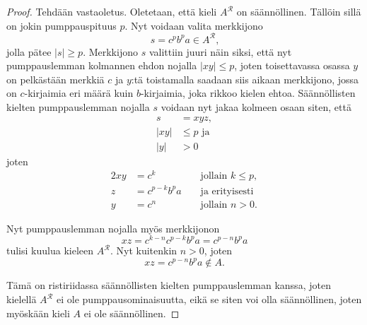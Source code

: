 \documentclass[a4paper,11pt]{article}
\begin{document}
\begin{enumerate}
\begin{enumerate}
\begin{proof}
            Tehdään vastaoletus. Oletetaan, että kieli $A^\mathcal{R}$ on säännöllinen.
            Tällöin sillä on jokin pumppauspituus $p$. Nyt voidaan valita merkkijono
            \begin{equation*}
              s = c^pb^pa \in A^\mathcal{R} \textrm{,}
            \end{equation*}
            jolla pätee $|s| \geq p$. Merkkijono $s$ valittiin juuri näin siksi, että
            nyt pumppauslemman kolmannen ehdon nojalla $|xy| \leq p$, joten
            toisettavassa osassa $y$ on pelkästään merkkiä $c$ ja $y$:tä toistamalla
            saadaan siis aikaan merkkijono, jossa on $c$-kirjaimia eri määrä kuin
            $b$-kirjaimia, joka rikkoo kielen ehtoa. Säännöllisten kielten
            pumppauslemman nojalla $s$ voidaan nyt jakaa kolmeen osaan siten, että
            \begin{align*}
              s    & = xyz, \\
              |xy| & \leq p \textrm{ ja}\\
              |y|  & > 0
            \end{align*}
            joten
            \begin{alignat*}{2}
              xy & = c^k         && \textrm{ jollain } k \leq p, \\
              z  & = c^{p-k}b^pa && \textrm{ ja erityisesti} \\
              y  & = c^n         && \textrm{ jollain } n > 0.
            \end{alignat*}
        
            Nyt pumppauslemman nojalla myös merkkijonon
            \begin{equation*}
              xz = c^{k-n}c^{p-k}b^pa = c^{p-n}b^pa
            \end{equation*}
            tulisi kuulua kieleen $A^\mathcal{R}$. Nyt kuitenkin $n > 0$, joten
            \begin{equation*}
              xz = c^{p-n}b^pa \notin A.
            \end{equation*}
        
            Tämä on ristiriidassa säännöllisten kielten pumppauslemman kanssa, joten
            kielellä $A^\mathcal{R}$ ei ole pumppausominaisuutta, eikä se siten voi olla
            säännöllinen, joten myöskään kieli $A$ ei ole säännöllinen.
    \end{proof}


\end{enumerate}
\end{enumerate}
\end{document}
